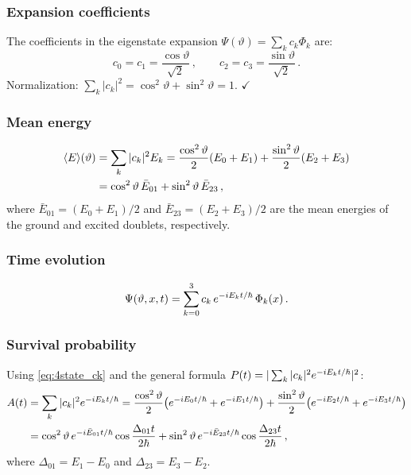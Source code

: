 \subsubsection{Expansion coefficients}

The coefficients in the eigenstate expansion $\Psi(\vartheta) = \sum_k c_k\Phi_k$ are:
\begin{equation}\label{eq:4state_ck}
  c_0 = c_1 = \frac{\cos\vartheta}{\sqrt{2}}\,,\qquad
  c_2 = c_3 = \frac{\sin\vartheta}{\sqrt{2}}\,.
\end{equation}
Normalization: $\sum_k |c_k|^2 = \cos^2\vartheta + \sin^2\vartheta = 1$. $\checkmark$

\subsubsection{Mean energy}

\begin{align}
  \langle E\rangle(\vartheta)
  &= \sum_k |c_k|^2 E_k
  = \frac{\cos^2\vartheta}{2}(E_0+E_1) + \frac{\sin^2\vartheta}{2}(E_2+E_3)\notag\\
  &= \cos^2\vartheta\,\bar{E}_{01} + \sin^2\vartheta\,\bar{E}_{23}\,,
\end{align}
where $\bar{E}_{01} = (E_0+E_1)/2$ and $\bar{E}_{23} = (E_2+E_3)/2$ are the mean
energies of the ground and excited doublets, respectively.

\subsubsection{Time evolution}

\begin{equation}
  \Psi(\vartheta, x, t) = \sum_{k=0}^{3}c_k\,e^{-iE_k t/\hbar}\,\Phi_k(x)\,.
\end{equation}

\subsubsection{Survival probability}

Using \cref{eq:4state_ck} and the general formula $P(t) = |\sum_k |c_k|^2 e^{-iE_k t/\hbar}|^2$:
\begin{align}
  A(t) &= \sum_k |c_k|^2 e^{-iE_k t/\hbar}
  = \frac{\cos^2\vartheta}{2}\bigl(e^{-iE_0 t/\hbar}+e^{-iE_1 t/\hbar}\bigr)
  + \frac{\sin^2\vartheta}{2}\bigl(e^{-iE_2 t/\hbar}+e^{-iE_3 t/\hbar}\bigr)\notag\\
  &= \cos^2\vartheta\,e^{-i\bar{E}_{01}t/\hbar}\cos\frac{\Delta_{01}t}{2\hbar}
  + \sin^2\vartheta\,e^{-i\bar{E}_{23}t/\hbar}\cos\frac{\Delta_{23}t}{2\hbar}\,,
\end{align}
where $\Delta_{01} = E_1 - E_0$ and $\Delta_{23} = E_3 - E_2$.

